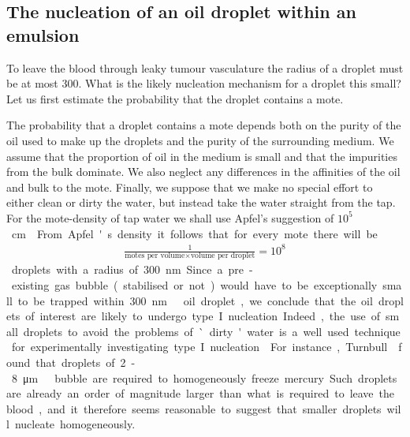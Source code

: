 \subsection{The nucleation of an oil droplet within an emulsion}


To leave the blood through leaky tumour vasculature the radius of a droplet must be at  most  \unit{300}\nano\metre\cite{Fukumori2006, Hashizume2000,  Hobbs1998}.
What is the likely nucleation mechanism for a droplet this small?
Let us first estimate the probability that the droplet contains a mote.

The probability that a droplet contains a mote depends both on the purity of the oil used to make up the droplets
and the purity of the surrounding medium.
We assume that the proportion of oil in the medium is small and that the impurities from the bulk dominate.
We also neglect any differences in the affinities of the oil and bulk to the mote.
Finally, we suppose that we make no special effort to either clean or dirty the water,
but instead take the water straight from the tap.
For the mote-density of tap water we shall use Apfel's\cite{Apfel1984} suggestion  of \unit{$10^5$}\centi\metre\rpcubed.

From Apfel's density it follows that for every mote there will be
\begin{align}
\frac{1}{\text{motes per volume}\times\text{volume per droplet}} = 10^8
\end{align} 
droplets with a radius of \unit{300}\nano\metre.
Since a pre-existing gas bubble (stabilised or not) would have to be exceptionally small to be trapped within \unit{300}\nano\metre\ oil droplet,
we conclude that  the oil droplets of interest are  likely to undergo type I nucleation.
Indeed, the use of small droplets to avoid the problems of `dirty' water is  a well used technique for experimentally investigating type I nucleation\cite{Turnbull1952, HongChul2005,Apfel1984}.
For instance, Turnbull\cite{Turnbull1952} found that droplets of 2-\unit{8}\micro\metre\ bubble are required to homogeneously freeze mercury.  
Such droplets are already an order of magnitude larger than what is required to leave the blood,
and it therefore seems reasonable to suggest that smaller droplets will nucleate homogeneously.




